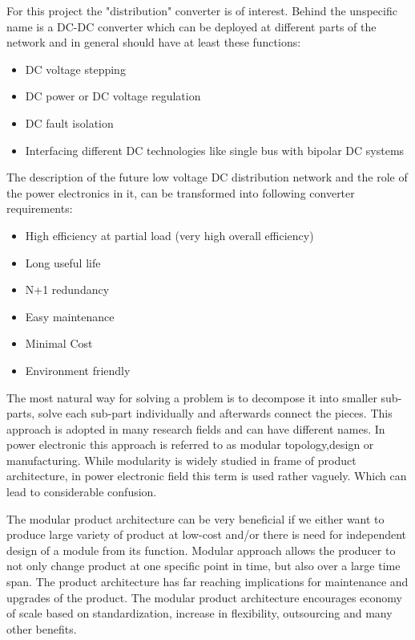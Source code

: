 \documentclass[]{scrreprt}
\begin{document}
For this project the "distribution" converter is of interest. Behind the unspecific name is a DC-DC converter which can be deployed at different parts of the network and in general should have at least these functions:
 \begin{itemize}
 	\item DC voltage stepping
 	\item DC power or DC voltage regulation
 	\item DC fault isolation
 	\item Interfacing different DC technologies like  single bus with bipolar DC systems
 \end{itemize}

The description of the future  low voltage DC distribution network and the role of the power electronics in it, can be transformed into following converter requirements:

 \begin{itemize}
 	\item High efficiency at partial load (very high overall efficiency)
 	\item Long useful life
 	\item N+1 redundancy
 	\item Easy maintenance
 	\item Minimal Cost
 	\item Environment friendly 
 \end{itemize}



The most natural way for solving a problem is to decompose it into smaller sub-parts, solve each sub-part individually and afterwards connect the pieces. %
This approach is adopted in many research fields and can have different names. In power electronic this approach is referred to as modular topology,design or manufacturing. While modularity is widely studied in frame of product architecture, in power electronic field this term is used rather vaguely. Which can lead to considerable confusion.

The modular product architecture can be very beneficial if we either want to produce large variety of product at low-cost and/or there is need for independent design of a module from its function. Modular approach allows the producer to not only change product at one specific point in time, but also over a large time span. The product architecture  has far reaching implications  for maintenance and upgrades of the product. The modular product architecture encourages economy of scale based on standardization, increase in flexibility, outsourcing and many other benefits.
\end{document}
